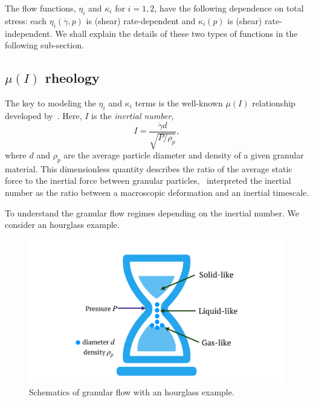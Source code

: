 

\par
The flow functions, $\eta_i$ and $\kappa_i$ for $i = 1,2$, have the following dependence on total stress: each $\eta_i(\dot{\gamma}, p)$ is (shear) rate-dependent and $\kappa_i (p)$ is (shear) rate-independent. 
We shall explain the details of these two types of functions in the following sub-section.

\subsection{$\mu (I)$ rheology}
The key to modeling the $\eta_i$ and $\kappa_i$ terms is the well-known $\mu(I)$ relationship developed by~\cite{jop_constitutive_2006}.
Here, $I$ is the \textit{inertial number},
\begin{equation}
  I =  \frac{\dot{\gamma} d }{\sqrt{P/\rho_p}},
  \label{eq_inertialI}
\end{equation}
where $d$ and $\rho_p$ are the average particle diameter and density of a given granular material.
This dimensionless quantity describes the ratio of the average static force to the inertial force between granular particles,~\cite{jop_constitutive_2006} interpreted the inertial number as the ratio between a macroscopic deformation and an inertial timescale. 
\par
To understand the granular flow regimes depending on the inertial number. We consider an hourglass example. 
\begin{figure}[ht]
  \begin{center}
    \includegraphics[scale=0.15]{figures/fig_hourglass.pdf}
    \end{center}
  \caption{Schematics of granular flow with an hourglass example.}
  \label{fig_hourglass}
\end{figure}
